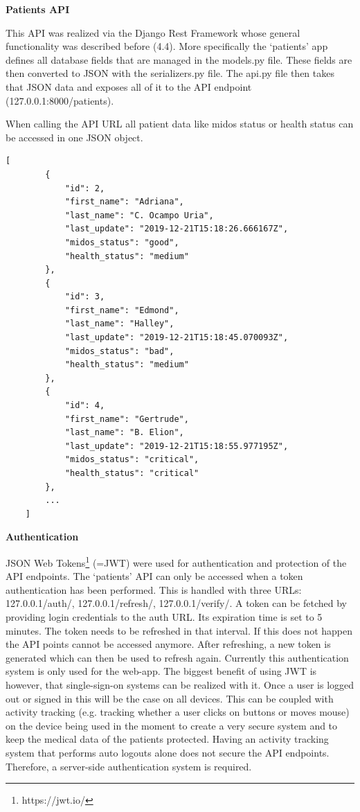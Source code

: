\textbf{Patients API}

This API was realized via the Django Rest Framework whose general functionality was described before (4.4). More specifically the ‘patients’ app defines all database fields that are managed in the models.py file. These fields are then converted to JSON with the serializers.py file. The api.py file then takes that JSON data and exposes all of it to the API endpoint (127.0.0.1:8000/patients).

When calling the API URL all patient data like midos status or health status can be accessed in one JSON object. \\

\begin{lstlisting}[label={lst:mylabel}, caption={'Patients' JSON object},captionpos=b, basicstyle=\small, tabsize=3]
	[
		{
			"id": 2,
			"first_name": "Adriana",
			"last_name": "C. Ocampo Uria",
			"last_update": "2019-12-21T15:18:26.666167Z",
			"midos_status": "good",
			"health_status": "medium"
		}, 
		{
			"id": 3,
			"first_name": "Edmond",
			"last_name": "Halley",
			"last_update": "2019-12-21T15:18:45.070093Z",
			"midos_status": "bad",
			"health_status": "medium"
		},
		{
			"id": 4,
			"first_name": "Gertrude",
			"last_name": "B. Elion",
			"last_update": "2019-12-21T15:18:55.977195Z",
			"midos_status": "critical",
			"health_status": "critical"
		},
		...
	]
\end{lstlisting}


\textbf{Authentication}

JSON Web Tokens\footnote{https://jwt.io/} (=JWT) were used for authentication and protection of the API endpoints. The ‘patients’ API can only be accessed when a token authentication has been performed. This is handled with three URLs: 127.0.0.1/auth/, 127.0.0.1/refresh/, 127.0.0.1/verify/. A token can be fetched by providing login credentials to the auth URL. Its expiration time is set to 5 minutes. The token needs to be refreshed in that interval. If this does not happen the API points cannot be accessed anymore. After refreshing, a new token is generated which can then be used to refresh again. Currently this authentication system is only used for the web-app. The biggest benefit of using JWT is however, that single-sign-on systems can be realized with it. Once a user is logged out or signed in this will be the case on all devices. This can be coupled with activity tracking (e.g. tracking whether a user clicks on buttons or moves mouse) on the device being used in the moment to create a very secure system and to keep the medical data of the patients protected. Having an activity tracking system that performs auto logouts alone does not secure the API endpoints. Therefore, a server-side authentication system is required. 

